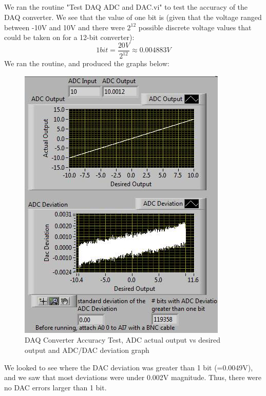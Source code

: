 \documentclass{article}
\begin{document}
\subsection{}
    We ran the routine "Test DAQ ADC and DAC.vi" to test the accuracy of the DAQ converter. We see that the value of one bit is (given that the voltage ranged between -10V and 10V and there were $2^{12}$ possible discrete voltage values that could be taken on for a 12-bit converter):
    \begin{equation}
        1 bit = \frac{20V}{2^{12}} \approx 0.004883 V
    \end{equation}
    We ran the routine, and produced the graphs below:
    \begin{figure}[H]
        \centering
        \includegraphics[scale = 0.5]{6a.png}
        \caption{DAQ Converter Accuracy Test, ADC actual output vs desired output and ADC/DAC deviation graph \cite{lab10}}
        \label{fig:my_label}
    \end{figure}
    We looked to see where the DAC deviation was greater than 1 bit (=0.0049V), and we saw that most deviations were under 0.002V magnitude. Thus, there were no DAC errors larger than 1 bit.
    
    
    
\end{document}
